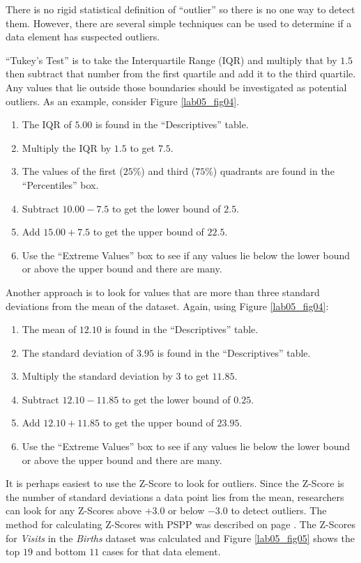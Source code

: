 There is no rigid statistical definition of ``outlier'' so there is no one way to detect them. However, there are several simple techniques can be used to determine if a data element has suspected outliers. 

``Tukey's Test'' is to take the Interquartile Range (IQR) and multiply that by $ 1.5 $ then subtract that number from the first quartile and add it to the third quartile. Any values that lie outside those boundaries should be investigated as potential outliers. As an example, consider Figure \ref{lab05_fig04}.

\begin{enumerate}
  \item The IQR of $ 5.00 $ is found in the ``Descriptives'' table.
  \item Multiply the IQR by $ 1.5 $ to get $ 7.5 $.
  \item The values of the first ($ 25\% $) and third ($ 75\% $) quadrants are found in the ``Percentiles'' box.
  \item Subtract $ 10.00 - 7.5 $ to get the lower bound of $ 2.5 $.
  \item Add $ 15.00 + 7.5 $ to get the upper bound of $ 22.5 $.
  \item Use the ``Extreme Values'' box to see if any values lie below the lower bound or above the upper bound and there are many.
\end{enumerate}

Another approach is to look for values that are more than three standard deviations from the mean of the dataset. Again, using Figure \ref{lab05_fig04}:

\begin{enumerate}
  \item The mean of $ 12.10 $ is found in the ``Descriptives'' table.
  \item The standard deviation of $ 3.95 $ is found in the ``Descriptives'' table.
  \item Multiply the standard deviation by $ 3 $ to get $ 11.85 $.
  \item Subtract $ 12.10-11.85 $ to get the lower bound of $ 0.25 $.
  \item Add $ 12.10+11.85 $ to get the upper bound of $ 23.95 $.
  \item Use the ``Extreme Values'' box to see if any values lie below the lower bound or above the upper bound and there are many.
\end{enumerate}

It is perhaps easiest to use the Z-Score to look for outliers. Since the Z-Score is the number of standard deviations a data point lies from the mean, researchers can look for any Z-Scores above $ +3.0 $ or below $ -3.0 $ to detect outliers. The method for calculating Z-Scores with \acs{PSPP} was described on page \pageref{z-scores}. The Z-Scores for \textit{Visits} in the \textit{Births} dataset was calculated and Figure \ref{lab05_fig05} shows the top $ 19 $ and bottom $ 11 $ cases for that data element.

